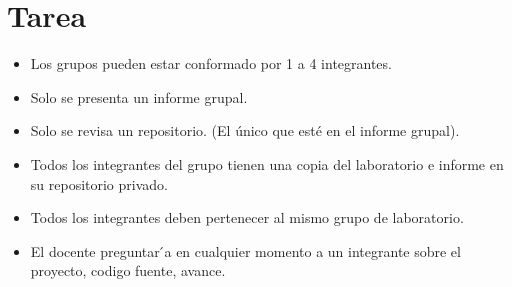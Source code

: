 \documentclass{article}
\begin{document}
  	\section{Tarea}
	\begin{itemize}		
Elabore un primer informe grupal de la aplicación que desarrollará durante este semestre. Utilicen todas las recomendaciones dadas en la aplicación library.
Acuerdos :
\item Los grupos pueden estar conformado por 1 a 4 integrantes.
\item Solo se presenta un informe grupal.
\item Solo se revisa un repositorio. (El único que esté en el informe grupal).
\item Todos los integrantes del grupo tienen una copia del laboratorio e informe en su repositorio privado.
\item Todos los integrantes deben pertenecer al mismo grupo de laboratorio.
\item El docente preguntar ́a en cualquier momento a un integrante sobre el proyecto, codigo fuente, avance.

	\end{itemize}
		
\end{document}
